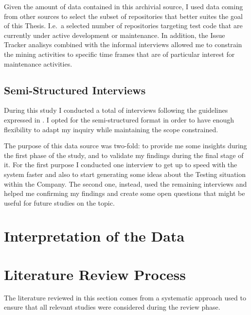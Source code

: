 Given the amount of data contained in this archivial source, I used data coming from other sources to select the subset of repositories that better suites the goal of this Thesis. I.e.\ a selected number of repositories targeting test code that are currently under active development or maintenance. In addition, the Issue Tracker analisys combined with the informal interviews allowed me to constrain the mining activities to specific time frames that are of particular interest for maintenance activities. 


\subsection{Semi-Structured Interviews} \label{semi-structured_interviews}
During this study I conducted a total of  interviews following the guidelines expressed in \cite{interview_guideline}. I opted for the semi-structured format in order to have enough flexibility to adapt my inquiry while maintaining the scope constrained.

The purpose of this data source was two-fold: to provide me some insights during the first phase of the study, and to validate my findings during the final stage of it. For the first purpose I conducted one interview to get up to speed with the system faster and also to start generating some ideas about the Testing situation within the Company. The second one, instead, used the remaining interviews and helped me confirming my findings and create some open questions that might be useful for future studies on the topic.




%
%
%
%


%
%
%
%
\section{Interpretation of the Data} \label{data_interpretation}








\section{Literature Review Process} \label{literature_review_process}
The literature reviewed in this section comes from a systematic approach used to ensure that all relevant studies were considered during the review phase.

